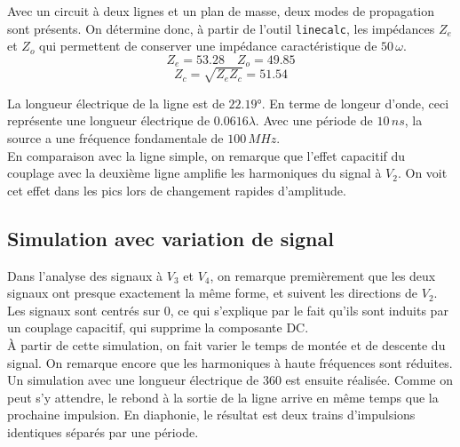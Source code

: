 Avec un circuit à deux lignes et un plan de masse, deux modes de propagation sont présents. On détermine donc, à partir de l'outil \texttt{linecalc}, les impédances $Z_e$ et $Z_o$ qui permettent de conserver une impédance caractéristique de $50\,\omega$.
\[Z_e = 53.28\quad Z_o = 49.85\]
\[Z_c = \sqrt{Z_eZ_c} = 51.54\]

La longueur électrique de la ligne est de $22.19°$. En terme de longeur d'onde, ceci représente une longueur électrique de $0.0616\lambda$. Avec une période de $10\,ns$, la source a une fréquence fondamentale de $100\,MHz$. 
\\
En comparaison avec la ligne simple, on remarque que l'effet capacitif du couplage avec la deuxième ligne amplifie les harmoniques du signal à $V_2$. On voit cet effet dans les pics lors de changement rapides d'amplitude.


\subsection{Simulation avec variation de signal}
Dans l'analyse des signaux à $V_3$ et $V_4$, on remarque premièrement que les deux signaux ont presque exactement la même forme, et suivent les directions de $V_2$. Les signaux sont centrés sur 0, ce qui s'explique par le fait qu'ils sont induits par un couplage capacitif, qui supprime la composante DC. 
\\
À partir de cette simulation, on fait varier le temps de montée et de descente du signal. On remarque encore que les harmoniques à haute fréquences sont réduites. 
\\
Un simulation avec une longueur électrique de 360 est ensuite réalisée. Comme on peut s'y attendre, le rebond à la sortie de la ligne arrive en même temps que la prochaine impulsion. En diaphonie, le résultat est deux trains d'impulsions identiques séparés par une période.

